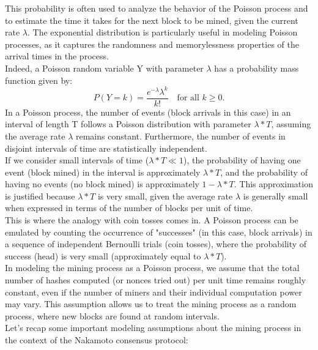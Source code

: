 \documentclass{report}
\begin{document}
This probability is often used to analyze the behavior of the Poisson process and to estimate the time it takes for the next block to be mined, given the current rate $\lambda$. The exponential distribution is particularly useful in modeling Poisson processes, as it captures the randomness and memorylessness properties of the arrival times in the process.\\
Indeed, a Poisson random variable Y with parameter $\lambda$ has a probability mass function given by:
$$P(Y = k) = \frac{e^{-\lambda} \lambda^k}{k!} \quad \text{for all } k \geq 0.$$
In a Poisson process, the number of events (block arrivals in this case) in an interval of length T follows a Poisson distribution with parameter $\lambda * T$, assuming the average rate $\lambda$ remains constant. Furthermore, the number of events in disjoint intervals of time are statistically independent.\\
If we consider small intervals of time ($\lambda * T \ll 1$), the probability of having one event (block mined) in the interval is approximately $\lambda * T$, and the probability of having no events (no block mined) is approximately $1 - \lambda * T$. This approximation is justified because $\lambda * T$ is very small, given the average rate $\lambda$ is generally small when expressed in terms of the number of blocks per unit of time.\\
This is where the analogy with coin tosses comes in. A Poisson process can be emulated by counting the occurrence of "successes" (in this case, block arrivals) in a sequence of independent Bernoulli trials (coin tosses), where the probability of success (head) is very small (approximately equal to $\lambda * T$).\\
In modeling the mining process as a Poisson process, we assume that the total number of hashes computed (or nonces tried out) per unit time remains roughly constant, even if the number of miners and their individual computation power may vary. This assumption allows us to treat the mining process as a random process, where new blocks are found at random intervals.\\
Let's recap some important modeling assumptions about the mining process in the context of the Nakamoto consensus protocol:\\
\end{document}
